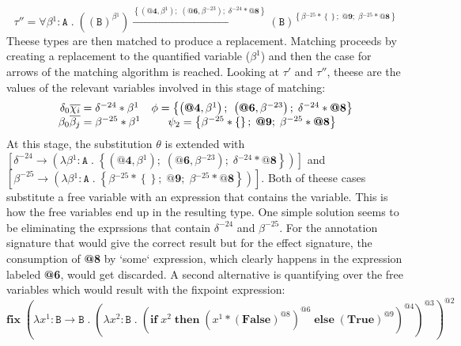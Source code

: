 \documentclass[8pt]{extarticle}
\begin{document}
\[
\tau'' = \forall{}\beta{}^{1}:\mathtt{A}\;{}.\;{}\left(\left(\mathtt{B}\right)^{\beta{}^{1}}\right)\xrightarrow{\left\{\left(\textbf{@4},\beta{}^{1}\right);\;{}\left(\textbf{@6},\beta{}^{-23}\right);\;{}\delta{}^{-24}*\textbf{@8}\right\}}\left(\mathtt{B}\right)^{\left\{\beta{}^{-25}*\left\{\right\};\;{}\textbf{@9};\;{}\beta{}^{-25}*\textbf{@8}\right\}}
\]
Theese types are then matched to produce a replacement. Matching proceeds by creating a replacement to the quantified variable ($\beta^1$) and then the case for arrows of the matching algorithm is reached. Looking at $\tau'$ and $\tau''$, theese are the values of the relevant variables involved in this stage of matching:
\[
\begin{array}{c c}
\delta_0\overline{\chi_i}=\delta{}^{-24}*\beta{}^{1} & \phi = \left\{\left(\textbf{@4},\beta{}^{1}\right);\;{}\left(\textbf{@6},\beta{}^{-23}\right);\;{}\delta{}^{-24}*\textbf{@8}\right\} \\
\beta_0\overline{\beta_j}=\beta{}^{-25}*\beta{}^{1} & \psi_2=\left\{\beta{}^{-25}*\left\{\right\};\;{}\textbf{@9};\;{}\beta{}^{-25}*\textbf{@8}\right\}
\end{array}
\]
At this stage, the substitution $\theta$ is extended with $\left[\delta^{-24}\to{}\left(\lambda{}\beta{}^{1}:\mathtt{A}\;{}.\;{}\left\{\left(\textbf{@4},\beta{}^{1}\right);\;{}\left(\textbf{@6},\beta{}^{-23}\right);\;{}\delta{}^{-24}*\textbf{@8}\right\}\right)\right]$ and\\ $\left[\beta^{-25}\to{}\left(\lambda{}\beta{}^{1}:\mathtt{A}\;{}.\;{}\left\{\beta{}^{-25}*\left\{\right\};\;{}\textbf{@9};\;{}\beta{}^{-25}*\textbf{@8}\right\}\right)\right]$. Both of theese cases substitute a free variable with an expression that contains the variable. This is how the free variables end up in the resulting type. One simple solution seems to be eliminating the exprssions that contain $\delta^{-24}$ and $\beta^{-25}$. For the annotation signature that would give the correct result but for the effect signature, the consumption of {\bf @8} by `some` expression, which clearly happens in the expression labeled {\bf @6}, would get discarded. A second alternative is quantifying over the free variables which would result with the fixpoint expression:
\[
\mathbf{fix}\;{}\left(\lambda{}x^{1}:\mathtt{B}\to{}\mathtt{B}\;{}.\;{}\left(\lambda{}x^{2}:\mathtt{B}\;{}.\;{}\left(\mathbf{if}\;{}x^{2}\;{}\mathbf{then}\;{}\left(x^{1}*\left(\mathbf{False}\right)^{\mathit{@8}}\right)^{\mathit{@6}}\;{}\mathbf{else}\;{}\left(\mathbf{True}\right)^{\mathit{@9}}\right)^{\mathit{@4}}\right)^{\mathit{@3}}\right)^{\mathit{@2}}
\]
\end{document}
